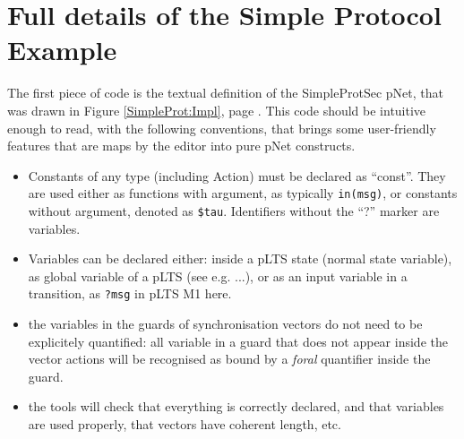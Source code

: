 

\section{Full details of the Simple Protocol Example}

\label{Appendix:FullExample}




  

The first piece of code is the textual definition of the SimpleProtSec
pNet, that was drawn in Figure \ref{SimpleProt:Impl}, page \pageref{SimpleProt:Impl}. This code should be intuitive enough to read, with the following
conventions, that brings some user-friendly features that are maps by the editor into pure pNet constructs.

\begin{itemize}
  \item Constants of any type (including Action) must be declared as
    ``const''. They are used either as functions with argument, as
    typically \texttt{in(msg)}, or constants without argument, denoted
    as \texttt{\$tau}. Identifiers without the ``?'' marker are
    variables.
  \item Variables can be declared either: inside a pLTS state (normal
    state variable), as global variable of a pLTS (see e.g. ...), or
    as an input variable in a transition, as \texttt{?msg} in pLTS M1
    here.
  \item the variables in the guards of synchronisation vectors do not need to be explicitely quantified: all variable in a guard that does not appear inside the vector actions will be recognised as bound by a \emph{foral} quantifier inside the guard.
    \item the tools will check that everything is correctly declared, and that variables are used properly, that vectors have coherent length, etc.
\end{itemize}

